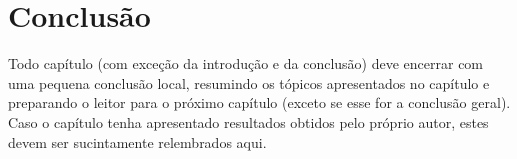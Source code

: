 
\section{Conclusão}

Todo capítulo (com exceção da introdução e da conclusão) deve encerrar com uma pequena conclusão local, resumindo os tópicos apresentados no capítulo e preparando o leitor para o próximo capítulo (exceto se esse for a conclusão geral). Caso o capítulo tenha apresentado resultados obtidos pelo próprio autor, estes devem ser sucintamente relembrados aqui.

